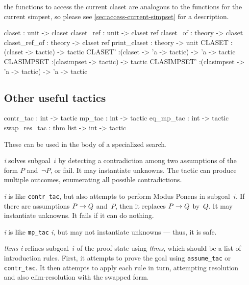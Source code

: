 the functions to access the current claset are analogous to the functions 
for the current simpset, so please see \ref{sec:access-current-simpset}
for a description.
\begin{ttbox}
claset        : unit   -> claset
claset_ref    : unit   -> claset ref
claset_of     : theory -> claset
claset_ref_of : theory -> claset ref
print_claset  : theory -> unit
CLASET        :(claset     ->       tactic) ->       tactic
CLASET'       :(claset     -> 'a -> tactic) -> 'a -> tactic
CLASIMPSET    :(clasimpset ->       tactic) ->       tactic
CLASIMPSET'   :(clasimpset -> 'a -> tactic) -> 'a -> tactic
\end{ttbox}


\subsection{Other useful tactics}
\begin{ttbox} 
contr_tac    :             int -> tactic
mp_tac       :             int -> tactic
eq_mp_tac    :             int -> tactic
swap_res_tac : thm list -> int -> tactic
\end{ttbox}
These can be used in the body of a specialized search.
\begin{ttdescription}
\item[\ttindexbold{contr_tac} {\it i}]
  solves subgoal~$i$ by detecting a contradiction among two assumptions of
  the form $P$ and~$\neg P$, or fail.  It may instantiate unknowns.  The
  tactic can produce multiple outcomes, enumerating all possible
  contradictions.

\item[\ttindexbold{mp_tac} {\it i}] 
is like \texttt{contr_tac}, but also attempts to perform Modus Ponens in
subgoal~$i$.  If there are assumptions $P\rightarrow Q$ and~$P$, then it replaces
$P\rightarrow Q$ by~$Q$.  It may instantiate unknowns.  It fails if it can do
nothing.

\item[\ttindexbold{eq_mp_tac} {\it i}] 
is like \texttt{mp_tac} {\it i}, but may not instantiate unknowns --- thus, it
is safe.

\item[\ttindexbold{swap_res_tac} {\it thms} {\it i}] refines subgoal~$i$ of
the proof state using {\it thms}, which should be a list of introduction
rules.  First, it attempts to prove the goal using \texttt{assume_tac} or
\texttt{contr_tac}.  It then attempts to apply each rule in turn, attempting
resolution and also elim-resolution with the swapped form.
\end{ttdescription}

